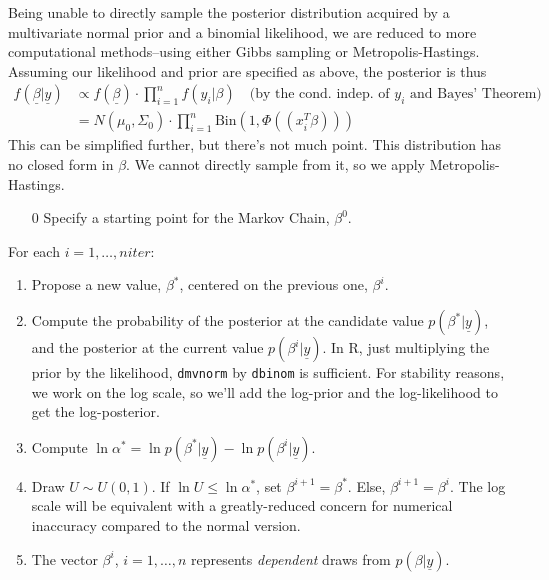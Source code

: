 \documentclass[12pt]{article}
\begin{document}
Being unable to directly sample the posterior distribution acquired by a multivariate normal prior and a binomial likelihood, we are reduced to more computational methods--using either Gibbs sampling or Metropolis-Hastings. Assuming our likelihood and prior are specified as above, the posterior is thus
	\begin{align*}
	f(\underline{\beta} | \underline{y}) &\propto f(\underline{\beta}) \cdot \prod_{i=1}^n f(y_i | \beta) \quad \text{(by the cond. indep. of } y_i\text{ and Bayes' Theorem)} \\
	&= N(\mu_0, \Sigma_0) \cdot \prod_{i=1}^n \textrm{Bin}(1,\Phi((x_{i}^{T}\beta)))
	\end{align*}
This can be simplified further, but there's not much point. This distribution has no closed form in $\beta$. We cannot directly sample from it, so we apply Metropolis-Hastings.
	\begin{enumerate}
	\item[0] Specify a starting point for the Markov Chain, $\beta^0$.
	\end{enumerate}
	For each $i = 1, \dots, niter$:
	\begin{enumerate}[resume]
	\item Propose a new value, $\beta^*$, centered on the previous one, $\beta^i$.
	\item Compute the probability of the posterior at the candidate value $p(\beta^* | \underline{y})$, and the posterior at the current value $p(\beta^i | \underline{y})$. In R, just multiplying the prior by the likelihood, \texttt{dmvnorm} by \texttt{dbinom} is sufficient. For stability reasons, we work on the log scale, so we'll add the log-prior and the log-likelihood to get the log-posterior.
	\item Compute $\ln \alpha^* = \ln p(\beta^* | \underline{y}) - \ln p(\beta^i | \underline{y})$.
	\item Draw $U \sim U(0,1)$. If $\ln U \leq \ln \alpha^*$, set $\beta^{i+1} = \beta^*$. Else, $\beta^{i+1} = \beta^{i}$. The log scale will be equivalent with a greatly-reduced concern for numerical inaccuracy compared to the normal version.
	\item The vector $\beta^i$, $i=1, \dots, n$ represents \emph{dependent} draws from $p(\beta | \underline{y})$. 
	\end{enumerate}
	
\end{document}
